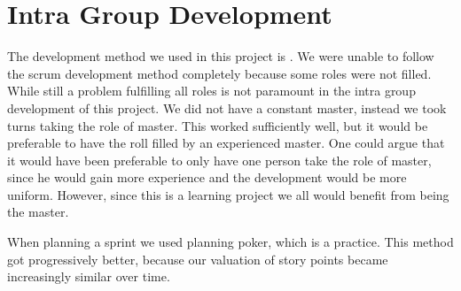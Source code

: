 \section{Intra Group Development}
\label{sec:intragroupdev}
The development method we used in this project is \scrum{}.
We were unable to follow the scrum development method completely because some roles were not filled.
While still a problem fulfilling all roles is not paramount in the intra group development of this project.
We did not have a constant \scrum{} master, instead we took turns taking the role of \scrum{} master.
This worked sufficiently well, but it would be preferable to have the roll filled by an experienced \scrum{} master.
One could argue that it would have been preferable to only have one person take the role of \scrum{} master, since he would gain more experience and the development would be more uniform.
However, since this is a learning project we all would benefit from being the \scrum{} master.

When planning a sprint we used planning poker, which is a \scrum{} practice.
This method got progressively better, because our valuation of story points became increasingly similar over time.




